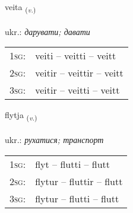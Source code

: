 \documentclass[frontgrid, backgrid]{flacards}\usepackage[]{graphicx}\usepackage[]{xcolor}
\begin{document}
{veita \small{\textsubscript{(\textit{v.})}} \\[1ex] %
\textphonetic{[veiːta]} \\
ukr.: \emph{дарувати; давати} \\  [2ex]
\renewcommand*{\arraystretch}{0.8}
\begin{tabular}{p{1cm}l}
\textsc{1sg}: & veiti -- veitti -- veitt \\ 
\textsc{2sg}: & veitir -- veittir -- veitt \\ 
\textsc{3sg}: & veitir -- veitti -- veitt \\ 
\end{tabular}
}

\renewcommand{\flhead}{\vskip5pt \fboxsep=0pt {\small\bfseries\footnotesize Sagnorð | дієслово}}
\renewcommand{\fcfoot}{\vskip5pt \fboxsep=0pt \hspace{2pt}{\small\bfseries\footnotesize 1K}}

\renewcommand{\blhead}{\vskip5pt {\small\bfseries\footnotesize Sagnorð | дієслово }}
\renewcommand{\bcfoot}{\vskip5pt \hspace{2pt}{\small\bfseries\footnotesize 1K}}


{flytja \small{\textsubscript{(\textit{v.})}} \\[1ex] %
\textphonetic{[flɪːtja]} \\
ukr.: \emph{рухатися; транспорт} \\  [2ex]
\renewcommand*{\arraystretch}{0.8}
\begin{tabular}{p{1cm}l}
\textsc{1sg}: & flyt -- flutti -- flutt \\ 
\textsc{2sg}: & flytur -- fluttir -- flutt \\ 
\textsc{3sg}: & flytur -- flutti -- flutt \\ 
\end{tabular}
}

\renewcommand{\flhead}{\vskip5pt \fboxsep=0pt {\small\bfseries\footnotesize Nafnorð | іменник}}
\renewcommand{\fcfoot}{\vskip5pt \fboxsep=0pt \hspace{2pt}{\small\bfseries\footnotesize 1K}}
\end{document}
